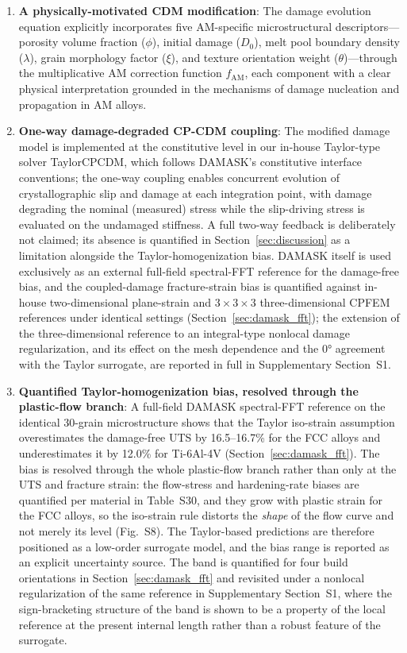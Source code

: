 \begin{enumerate}
    \item \textbf{A physically-motivated CDM modification}: The damage evolution equation explicitly incorporates five AM-specific microstructural descriptors---porosity volume fraction ($\phi$), initial damage ($D_0$), melt pool boundary density ($\lambda$), grain morphology factor ($\xi$), and texture orientation weight ($\theta$)---through the multiplicative AM correction function $f_{\text{AM}}$, each component with a clear physical interpretation grounded in the mechanisms of damage nucleation and propagation in AM alloys.
    
    \item \textbf{One-way damage-degraded CP-CDM coupling}: The modified damage model is implemented at the constitutive level in our in-house Taylor-type solver TaylorCPCDM, which follows DAMASK's constitutive interface conventions; the one-way coupling enables concurrent evolution of crystallographic slip and damage at each integration point, with damage degrading the nominal (measured) stress while the slip-driving stress is evaluated on the undamaged stiffness. A full two-way feedback is deliberately not claimed; its absence is quantified in Section~\ref{sec:discussion} as a limitation alongside the Taylor-homogenization bias. DAMASK itself is used exclusively as an external full-field spectral-FFT reference for the damage-free bias, and the coupled-damage fracture-strain bias is quantified against in-house two-dimensional plane-strain and $3\times3\times3$ three-dimensional CPFEM references under identical settings (Section~\ref{sec:damask_fft}); the extension of the three-dimensional reference to an integral-type nonlocal damage regularization, and its effect on the mesh dependence and the $\ang{0}$ agreement with the Taylor surrogate, are reported in full in Supplementary Section~S1.
    
    \item \textbf{Quantified Taylor-homogenization bias, resolved through the plastic-flow branch}: A full-field DAMASK spectral-FFT reference on the identical 30-grain microstructure shows that the Taylor iso-strain assumption overestimates the damage-free UTS by 16.5--16.7\% for the FCC alloys and underestimates it by 12.0\% for Ti-6Al-4V (Section~\ref{sec:damask_fft}). The bias is resolved through the whole plastic-flow branch rather than only at the UTS and fracture strain: the flow-stress and hardening-rate biases are quantified per material in Table~S30, and they grow with plastic strain for the FCC alloys, so the iso-strain rule distorts the \emph{shape} of the flow curve and not merely its level (Fig.~S8). The Taylor-based predictions are therefore positioned as a low-order surrogate model, and the bias range is reported as an explicit uncertainty source. The band is quantified for four build orientations in Section~\ref{sec:damask_fft} and revisited under a nonlocal regularization of the same reference in Supplementary Section~S1, where the sign-bracketing structure of the band is shown to be a property of the local reference at the present internal length rather than a robust feature of the surrogate.
    

\end{enumerate}
